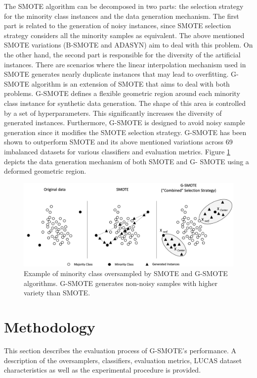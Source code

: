 \documentclass[remotesensing,article,submit,moreauthors,pdftex]{Definitions/mdpi}
\begin{document}
The SMOTE algorithm can be decomposed in two parts: the selection strategy for
the minority class instances and the data generation mechanism. The first part
is related to the generation of noisy instances, since SMOTE selection strategy
considers all the minority samples as equivalent. The above mentioned SMOTE
variations (B-SMOTE and ADASYN) aim to deal with this problem. On the other
hand, the second part is responsible for the diversity of the artificial
instances. There are scenarios where the linear interpolation mechanism used in
SMOTE generates nearly duplicate instances that may lead to overfitting. G-SMOTE
algorithm is an extension of SMOTE that aims to deal with both problems. G-SMOTE
defines a flexible geometric region around each minority class instance for
synthetic data generation. The shape of this area is controlled by a set of
hyperparameters. This significantly increases the diversity of generated
instances. Furthermore, G-SMOTE is designed to avoid noisy sample generation
since it modifies the SMOTE selection strategy. G-SMOTE has been shown to 
outperform SMOTE and its above  mentioned variations across 69 imbalanced
datasets for various classifiers and evaluation metrics. Figure
\ref{fig:gsmote_smote} depicts the data generation mechanism of both SMOTE and G-
SMOTE using a deformed geometric region.

\begin{figure}[H]
	\centering
	\includegraphics[width=1\linewidth]{../analysis/gsmote_smote}
	\caption{Example of minority class oversampled by SMOTE and G-SMOTE
	algorithms. G-SMOTE generates non-noisy samples
	with higher variety than SMOTE.}
	\label{fig:gsmote_smote}
\end{figure}

\section{Methodology}

This section describes the evaluation process of G-SMOTE's performance. A
description of the oversamplers, classifiers, evaluation metrics, LUCAS dataset
characteristics as well as the experimental procedure is provided.
\end{document}
